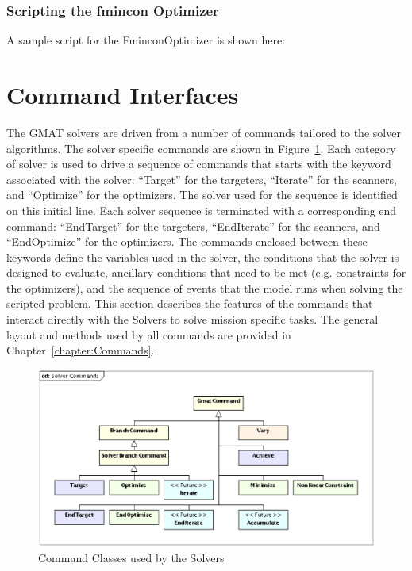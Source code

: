 \begin{quote}
\end{quote}

\subsubsection{Scripting the fmincon Optimizer}

A sample script for the FminconOptimizer is shown here:

\begin{quote}
\end{quote}

\section{Command Interfaces}

The GMAT solvers are driven from a number of commands tailored to the solver algorithms.  The solver
specific commands are shown in Figure~\ref{figure:SolverCommandClasses}.  Each
category of solver is used to drive a sequence of commands that starts with the keyword associated
with the solver: ``Target'' for the targeters, ``Iterate'' for the scanners, and ``Optimize'' for
the optimizers.  The solver used for the sequence is identified on this initial line.  Each solver
sequence is terminated with a corresponding end command: ``EndTarget'' for the targeters,
``EndIterate'' for the scanners, and ``EndOptimize'' for the optimizers.  The commands enclosed
between these keywords define the variables used in the solver, the conditions that the solver is
designed to evaluate, ancillary conditions that need to be met (e.g. constraints for the
optimizers), and the sequence of events that the model runs when solving the scripted problem.  This
section describes the features of the commands that interact directly with the Solvers to solve
mission specific tasks.  The general layout and methods used by all commands are provided in
Chapter~\ref{chapter:Commands}.

\begin{figure}[htb]
\begin{center}
\includegraphics[scale=0.5]{Images/SolverCommands.eps}
\caption{\label{figure:SolverCommandClasses}Command Classes used by the Solvers}
\end{center}
\end{figure}

